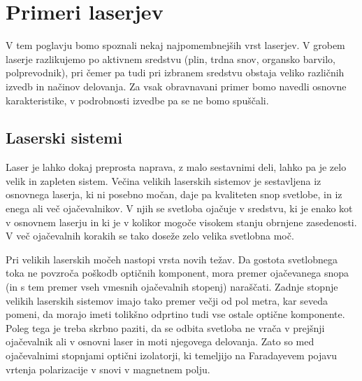 \chapter{Primeri laserjev}
\label{chap:Primeri}
V tem poglavju bomo spoznali nekaj najpomembnejših vrst laserjev.
V grobem laserje razlikujemo po aktivnem sredstvu 
(plin, trdna snov, organsko barvilo, polprevodnik), pri čemer pa tudi pri izbranem
sredstvu obstaja veliko različnih izvedb in načinov delovanja. Za vsak 
obravnavani primer bomo navedli osnovne karakteristike, v podrobnosti 
izvedbe pa se ne bomo spuščali. 

\section{Laserski sistemi}
Laser  je lahko dokaj preprosta naprava, z malo sestavnimi deli, 
lahko pa je zelo velik in zapleten sistem. Večina velikih laserskih sistemov
je sestavljena iz osnovnega laserja, ki ni posebno močan, daje pa kvaliteten
snop svetlobe, in iz enega ali več ojačevalnikov. V njih se svetloba 
ojačuje v sredstvu, ki je enako kot v osnovnem laserju in ki je v kolikor 
mogoče visokem stanju obrnjene zasedenosti. V več ojačevalnih korakih 
se tako doseže zelo velika svetlobna moč. 

Pri velikih laserskih močeh nastopi vrsta novih težav. Da gostota 
svetlobnega toka ne povzroča poškodb optičnih komponent, mora 
premer ojačevanega snopa (in s tem premer vseh vmesnih ojačevalnih stopenj) 
naraščati. Zadnje stopnje velikih laserskih sistemov imajo 
tako premer večji od pol metra, kar seveda pomeni, da morajo imeti tolikšno odprtino 
tudi vse ostale optične komponente. Poleg tega je
treba skrbno paziti, da se odbita svetloba ne vrača v prejšnji
ojačevalnik ali v osnovni laser in moti njegovega delovanja. Zato so med
ojačevalnimi stopnjami optični izolatorji, ki temeljijo na Faradayevem
pojavu vrtenja polarizacije v snovi v magnetnem polju.

